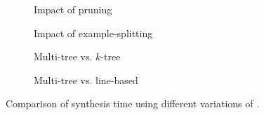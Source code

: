 \begin{figure}[t]
    \centering
    
    \begin{subfigure}[b]{0.45\textwidth}
         \centering
         \caption{Impact of pruning}
         \label{fig:mt_vs_nopruning}
     \end{subfigure}
     \hfill
     \begin{subfigure}[b]{0.45\textwidth}
         \centering
         \caption{Impact of example-splitting}
         \label{fig:mt_vs_dynamic}
     \end{subfigure}
     \par\vspace{2.5em}
     \begin{subfigure}[b]{0.45\textwidth}
         \centering
         \caption{Multi-tree vs. \(k\)-tree}
         \label{fig:mt_vs_ktree}
     \end{subfigure}
     \hfill
     \begin{subfigure}[b]{0.45\textwidth}
         \centering
         \caption{Multi-tree vs. line-based}
         \label{fig:mt_vs_lines}
     \end{subfigure}
\captionsetup{belowskip=-8pt}
\caption{Comparison of synthesis time using different variations of \Forest{}.}
\label{fig:time-comparison-funny}
\end{figure}